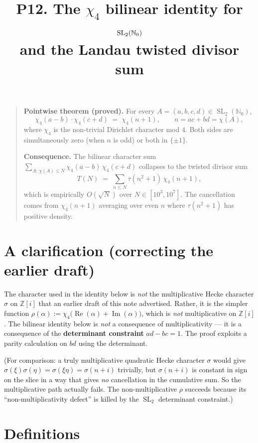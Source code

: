 \documentclass[11pt]{article}
\title{P12. The $\chi_4$ bilinear identity for $\SL_2(\mathbb{N}_0)$ \\
and the Landau twisted divisor sum}
\author{}
\date{}
\DeclareMathOperator{\SL}{SL}
\DeclareMathOperator{\Re}{Re}
\DeclareMathOperator{\Im}{Im}
\begin{document}
\maketitle

\begin{quote}
\textbf{Pointwise theorem (proved).} For every
$A = (a,b,c,d) \in \SL_2(\mathbb{N}_0)$,
\[
\chi_4(a-b) \cdot \chi_4(c+d) \;=\; \chi_4(n+1), \qquad n = ac+bd = \chi(A),
\]
where $\chi_4$ is the non-trivial Dirichlet character mod $4$. Both sides are
simultaneously zero (when $n$ is odd) or both in $\{\pm 1\}$.

\textbf{Consequence.} The bilinear character sum
$\sum_{A:\,\chi(A) \le N} \chi_4(a-b)\,\chi_4(c+d)$ collapses to the twisted
divisor sum
\[
T(N) \;=\; \sum_{n \le N} \tau(n^2+1)\,\chi_4(n+1),
\]
which is empirically $O(\sqrt N)$ over $N \in [10^3, 10^7]$. The cancellation
comes from $\chi_4(n+1)$ averaging over even $n$ where $\tau(n^2+1)$ has positive
density.
\end{quote}

\section*{A clarification (correcting the earlier draft)}

The character used in the identity below is \emph{not} the multiplicative Hecke
character $\sigma$ on $\mathbb{Z}[i]$ that an earlier draft of this note
advertised. Rather, it is the simpler function
$\rho(\alpha) := \chi_4\bigl(\Re(\alpha) + \Im(\alpha)\bigr)$, which is
\emph{not} multiplicative on $\mathbb{Z}[i]$. The bilinear identity below is
\emph{not} a consequence of multiplicativity --- it is a consequence of the
\textbf{determinant constraint} $ad - bc = 1$. The proof exploits a parity
calculation on $bd$ using the determinant.

(For comparison: a truly multiplicative quadratic Hecke character $\sigma$
would give $\sigma(\xi)\sigma(\eta) = \sigma(\xi\eta) = \sigma(n+i)$ trivially,
but $\sigma(n+i)$ is constant in sign on the slice in a way that gives \emph{no}
cancellation in the cumulative sum. So the multiplicative path actually fails.
The non-multiplicative $\rho$ succeeds because its ``non-multiplicativity
defect'' is killed by the $\SL_2$ determinant constraint.)

\section{Definitions}
\end{document}

